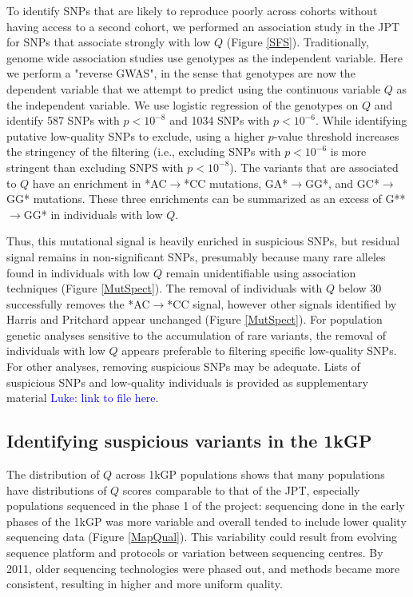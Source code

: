 \documentclass[9pt,lineno]{elife}
\newcommand{\luke}[1]{\textcolor{blue}{Luke: #1}}
\begin{document}
To identify SNPs that are likely to reproduce poorly across cohorts without having access to a second cohort, we performed an association study in the JPT for SNPs that associate strongly with low $Q$ (Figure \ref{SFS}).
Traditionally, genome wide association studies use genotypes as the independent variable. 
Here we perform a "reverse GWAS", in the sense that genotypes are now the dependent variable that we attempt to predict using the continuous variable $Q$ as the independent variable.
We use logistic regression of the genotypes on $Q$ and identify 587 SNPs with $p < 10^{-8}$ and 1034 SNPs with $ p < 10^{-6}$. 
While identifying putative low-quality SNPs to exclude, using a higher $p$-value threshold increases the stringency of the filtering (i.e., excluding SNPs with $ p < 10^{-6}$ is more stringent than excluding SNPS with $p < 10^{-8}$). 
The variants that are associated to $Q$ have an enrichment in *AC${\rightarrow}$*CC mutations, GA*${\rightarrow}$GG*, and GC*${\rightarrow}$GG* mutations.
These three enrichments can be summarized as an excess of G**${\rightarrow}$GG* in individuals with low $Q$.

Thus, this mutational signal is heavily enriched in suspicious SNPs, but residual signal remains in non-significant SNPs, presumably because many rare alleles found in individuals with low $Q$ remain unidentifiable using association techniques (Figure \ref{MutSpect}).
The removal of individuals with $Q$ below 30 successfully removes the *AC${\rightarrow}$*CC signal, however other signals identified by Harris and Pritchard appear unchanged (Figure \ref{MutSpect}).
For population genetic analyses sensitive to the accumulation of rare variants, the removal of individuals with low $Q$ appears preferable to filtering specific low-quality SNPs. 
For other analyses, removing suspicious SNPs may be adequate. 
Lists of suspicious SNPs and low-quality individuals is provided as supplementary material \luke{link to file here}.

\subsection{Identifying suspicious variants in the 1kGP}
The distribution of $Q$ across 1kGP populations shows that many populations have distributions of $Q$ scores comparable to that of the JPT, especially populations sequenced in the phase 1 of the project: sequencing done in the early phases of the 1kGP was more variable and overall tended to include lower quality sequencing data (Figure \ref{MapQual}).
This variability could result from evolving sequence platform and protocols or variation between sequencing centres. 
By 2011, older sequencing technologies were phased out, and methods became more consistent, resulting in higher and more uniform quality.
\end{document}
